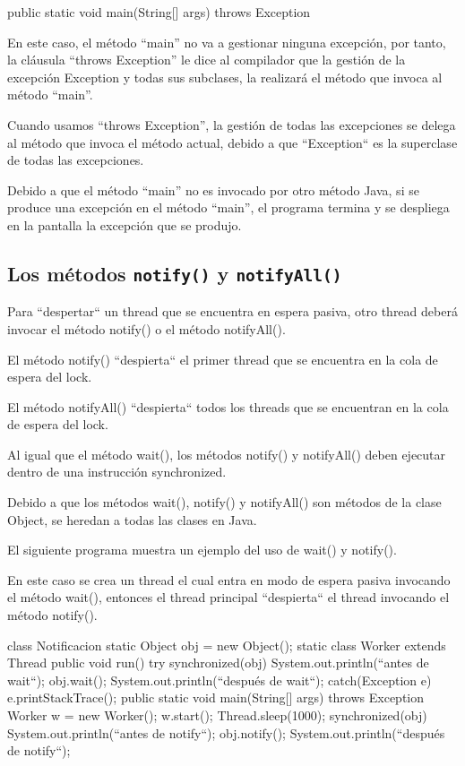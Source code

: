 \begin{SourceCode}
public static void main(String[] args) throws Exception
\end{SourceCode}

En este caso, el método “main” no va a gestionar ninguna excepción, por tanto, la cláusula “throws Exception” le dice al compilador que la gestión de la excepción Exception y todas sus subclases, la realizará el método que invoca al método “main”.

Cuando usamos “throws Exception”, la gestión de todas las excepciones se delega al método que invoca el método actual, debido a que ``Exception`` es la superclase de todas las excepciones.

Debido a que el método “main” no es invocado por otro método Java, si se produce una excepción en el método “main”, el programa termina y se despliega en la pantalla la excepción que se produjo.

\subsection{Los métodos \texttt{notify()} y \texttt{notifyAll()}}

Para ``despertar`` un thread que se encuentra en espera pasiva, otro thread deberá invocar el método notify() o el método notifyAll().

El método notify() ``despierta`` el primer thread que se encuentra en la cola de espera del lock.

El método notifyAll() ``despierta`` todos los threads que se encuentran en la cola de espera del lock.

Al igual que el método wait(), los métodos notify() y notifyAll() deben ejecutar dentro de una instrucción synchronized.

Debido a que los métodos wait(), notify() y notifyAll() son métodos de la clase Object, se heredan a todas las clases en Java.

El siguiente programa muestra un ejemplo del uso de wait() y notify().

En este caso se crea un thread el cual entra en modo de espera pasiva invocando el método wait(), entonces el thread principal ``despierta`` el thread invocando el método notify().

\begin{SourceCode}
class Notificacion
{
  static Object obj = new Object();
  static class Worker extends Thread
  {
    public void run()
    {
      try
      {
        synchronized(obj)
        {
          System.out.println(``antes de wait``);
          obj.wait();
          System.out.println(``después de wait``);
        }
      }
      catch(Exception e)
      {
        e.printStackTrace();
      }
    }
  }
  public static void main(String[] args) throws Exception
  {
    Worker w = new Worker();
    w.start();
    Thread.sleep(1000);
    synchronized(obj)
    {
      System.out.println(``antes de notify``);
      obj.notify();
      System.out.println(``después de notify``);
    }
  }
}
\end{SourceCode}


